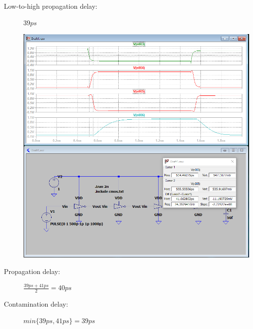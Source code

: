 \documentclass[a4paper, 11pt]{article}
\begin{document}
\begin{description}
\begin{center}
	      \end{center}
	\item[Low-to-high propagation delay:] $39ps$ \hfill
	      \begin{center}
		      \includegraphics[scale=0.38]{mikro_lab3/low_to_high2.PNG}
	      \end{center}
	\item[Propagation delay:] $\frac{39ps + 41ps}{2} = 40ps $
	\item[Contamination delay:] $ min\{39ps, 41ps\} = 39ps $
\end{description}

\pagebreak
\end{document}
